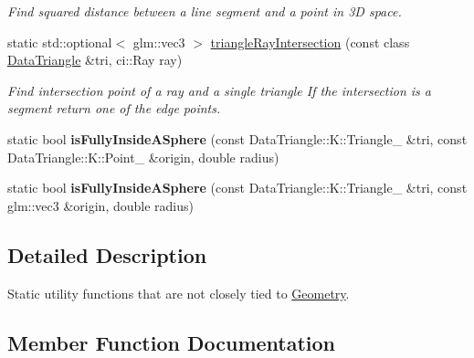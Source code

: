 \begin{DoxyCompactItemize}
\begin{DoxyCompactList}\small\item\em Find squared distance between a line segment and a point in 3D space. \end{DoxyCompactList}\item 
\mbox{\label{classpepr3d_1_1_geometry_utils_afee093fc93f94d5d7552611a34931ea2}} 
static std\+::optional$<$ glm\+::vec3 $>$ \mbox{\hyperlink{classpepr3d_1_1_geometry_utils_afee093fc93f94d5d7552611a34931ea2}{triangle\+Ray\+Intersection}} (const class \mbox{\hyperlink{classpepr3d_1_1_data_triangle}{Data\+Triangle}} \&tri, ci\+::\+Ray ray)
\begin{DoxyCompactList}\small\item\em Find intersection point of a ray and a single triangle If the intersection is a segment return one of the edge points. \end{DoxyCompactList}\item 
\mbox{\label{classpepr3d_1_1_geometry_utils_a1c82cbd47ad61dbf93685a3daf47c49a}} 
static bool {\bfseries is\+Fully\+Inside\+A\+Sphere} (const Data\+Triangle\+::\+K\+::\+Triangle\+\_ \&tri, const Data\+Triangle\+::\+K\+::\+Point\+\_ \&origin, double radius)
\item 
\mbox{\label{classpepr3d_1_1_geometry_utils_a7ee493c277ad6aa4e87b2508a0f6c2c9}} 
static bool {\bfseries is\+Fully\+Inside\+A\+Sphere} (const Data\+Triangle\+::\+K\+::\+Triangle\+\_ \&tri, const glm\+::vec3 \&origin, double radius)
\end{DoxyCompactItemize}


\subsection{Detailed Description}
Static utility functions that are not closely tied to \mbox{\hyperlink{classpepr3d_1_1_geometry}{Geometry}}. 

\subsection{Member Function Documentation}
\mbox{\label{classpepr3d_1_1_geometry_utils_a982761c1e66eb293064c3acbffe5ede3}} 
